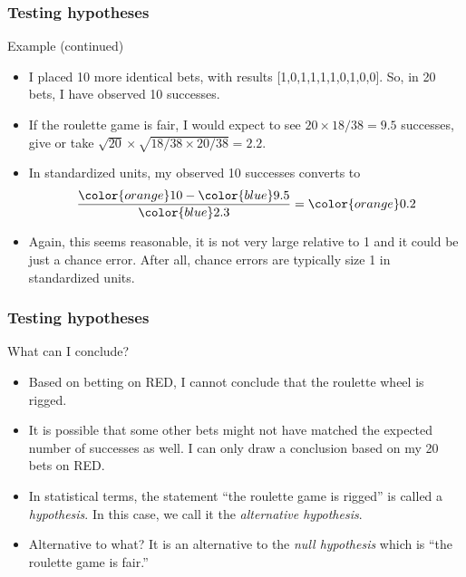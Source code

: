 \documentclass[handout]{beamer}
\begin{document}

   \begin{frame} \frametitle{Testing hypotheses}

   \begin{block}
   {Example (continued)}
   \begin{itemize}
   \item I placed 10 more identical bets, with results
   [1,0,1,1,1,1,0,1,0,0]. So, in 20 bets, I have observed 10 successes.
   \item If the roulette game is fair, I would expect
   to see $20 \times 18/ 38=9.5$  successes, give or take
   $\sqrt{20} \times \sqrt{18/38 \times 20/38}=2.2$.

   \item In standardized units, my observed 10 successes converts to
   $$
   \frac{{\color{orange} 10} - {\color{blue} 9.5}}{{\color{blue} 2.3}} = {\color{orange} 0.2}
   $$

   \item Again, this seems reasonable, it is not very large relative to 1 and it could
   be just a chance error. After all, chance errors are typically size 1 in standardized units.


   \end{itemize}
   \end{block}
   \end{frame}


   \begin{frame} \frametitle{Testing hypotheses}

   \begin{block}
   {What can I conclude?}
   \begin{itemize}
   \item Based on betting on {\color{red} RED}, I cannot conclude that the roulette
   wheel is rigged.

   \item It is possible that some other bets might not have matched the expected number of
   successes as well. I can only draw a conclusion based on my 20 bets on {\color{red} RED}.

   \item In statistical terms, the statement ``the roulette game is rigged'' is called
   a {\em hypothesis}. In this case, we call it the {\em alternative hypothesis}.

   \item Alternative to what? It is an alternative to the {\em null hypothesis} which is
   ``the roulette game is fair.''


   \end{itemize}
   \end{block}
   \end{frame}
\end{document}
